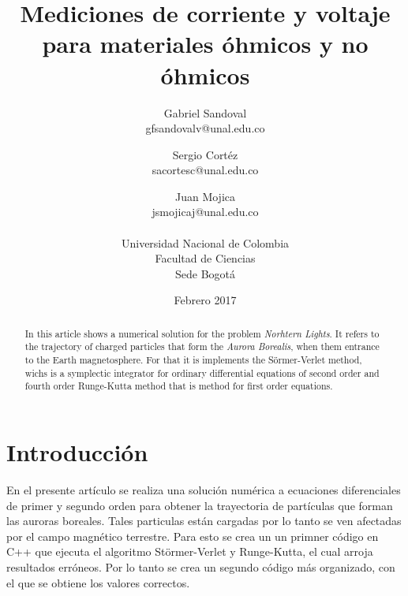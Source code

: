 \documentclass[10pt,twocolumn]{article}
\title{Mediciones de corriente y voltaje para materiales \'ohmicos y no \'ohmicos}
\author{Gabriel Sandoval \\ gfsandovalv@unal.edu.co \and Sergio Cortéz \\sacortesc@unal.edu.co \and Juan Mojica \\jsmojicaj@unal.edu.co\\ \\Universidad Nacional de Colombia\\Facultad de Ciencias \\ Sede Bogotá}
\date{Febrero 2017}
\begin{document}
\maketitle
\begin{abstract}
In this article shows a numerical solution for the problem \emph{Norhtern Lights}. It refers to the trajectory of charged particles that form the \emph{Aurora Borealis}, when them entrance to the Earth magnetosphere. For that it is implements the Sörmer-Verlet method, wichs is a symplectic integrator for ordinary differential equations of second order and fourth order Runge-Kutta method that is method for first order equations.  
\end{abstract}

\section{Introducción}
En el presente artículo se realiza una solución numérica a ecuaciones diferenciales de primer y segundo orden para obtener la trayectoria de partículas que forman las auroras boreales. Tales particulas están cargadas por lo tanto se ven afectadas por el campo magnético terrestre. Para esto se crea un un primner código en C++ que ejecuta el algoritmo Störmer-Verlet y Runge-Kutta, el cual arroja resultados erróneos. Por lo tanto se crea un segundo código más organizado, con el que se obtiene los valores correctos.
\end{document}

